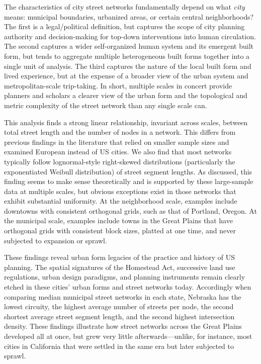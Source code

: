 \documentclass[Afour,sageh,times]{sagej}
\begin{document}
The characteristics of city street networks fundamentally depend on what \emph{city} means: municipal boundaries, urbanized areas, or certain central neighborhoods? The first is a legal/political definition, but captures the scope of city planning authority and decision-making for top-down interventions into human circulation. The second captures a wider self-organized human system and its emergent built form, but tends to aggregate multiple heterogeneous built forms together into a single unit of analysis. The third captures the nature of the local built form and lived experience, but at the expense of a broader view of the urban system and metropolitan-scale trip-taking. In short, multiple scales in concert provide planners and scholars a clearer view of the urban form and the topological and metric complexity of the street network than any single scale can.

This analysis finds a strong linear relationship, invariant across scales, between total street length and the number of nodes in a network. This differs from previous findings in the literature that relied on smaller sample sizes and examined European instead of US cities. We also find that most networks typically follow lognormal-style right-skewed distributions (particularly the exponentiated Weibull distribution) of street segment lengths. As discussed, this finding seems to make sense theoretically and is supported by these large-sample data at multiple scales, but obvious exceptions exist in those networks that exhibit substantial uniformity. At the neighborhood scale, examples include downtowns with consistent orthogonal grids, such as that of Portland, Oregon. At the municipal scale, examples include towns in the Great Plains that have orthogonal grids with consistent block sizes, platted at one time, and never subjected to expansion or sprawl.

These findings reveal urban form legacies of the practice and history of US planning. The spatial signatures of the Homestead Act, successive land use regulations, urban design paradigms, and planning instruments remain clearly etched in these cities' urban forms and street networks today. Accordingly when comparing median municipal street networks in each state, Nebraska has the lowest circuity, the highest average number of streets per node, the second shortest average street segment length, and the second highest intersection density. These findings illustrate how street networks across the Great Plains developed all at once, but grew very little afterwards---unlike, for instance, most cities in California that were settled in the same era but later subjected to sprawl.
\end{document}
